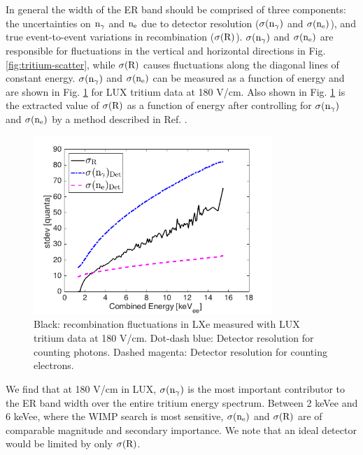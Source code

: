 In general the width of the ER band should be comprised of three components: the uncertainties on  $\rm n_{\gamma}$ and $\rm n_e$  due to detector resolution ($\rm \sigma(n_{\gamma})$ and $\rm \sigma(n_e)$), and true event-to-event variations in recombination ($\rm \sigma(R)$). $\rm \sigma(n_{\gamma})$ and $\rm \sigma(n_e)$ are responsible for fluctuations in the vertical  and horizontal directions in Fig. \ref{fig:tritium-scatter},  while 
$\rm \sigma(R)$ causes fluctuations along the diagonal lines of constant energy. $\rm \sigma(n_{\gamma})$ and $\rm \sigma(n_e)$ can be measured as a function of energy and are shown in Fig. \ref{fig:recomb-flucs} for LUX tritium data at 180 V/cm\cite{Dobi_Thesis}. Also shown in Fig. \ref{fig:recomb-flucs} is the extracted value of $\rm \sigma(R)$ as a function of energy after controlling for $\rm \sigma(n_{\gamma})$ and $\rm \sigma(n_e)$ by a method described in Ref. \cite{Dobi_Thesis}. 

\begin{figure}[h!]\centering
\includegraphics[width=90mm]{fig/recomb_flucs.png}
\caption{Black: recombination fluctuations in LXe measured with LUX tritium data at 180 V/cm. Dot-dash blue: Detector resolution for counting photons. Dashed magenta: Detector resolution for counting electrons.}
\label{fig:recomb-flucs}
\end{figure}

We find that at 180 V/cm in LUX, $\rm \sigma(n_{\gamma})$ is the most important contributor to the ER band width over the entire tritium energy spectrum. Between 2 keVee and 6 keVee, where the WIMP search is most sensitive, $\rm \sigma(n_e)$ and $\rm \sigma(R)$ are of comparable magnitude and secondary importance. We note that an ideal detector would be limited by only $\rm \sigma(R)$.





